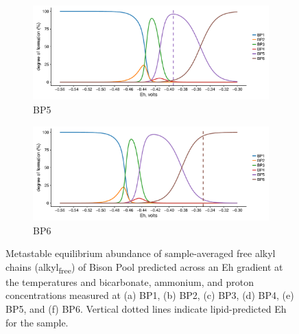 {\begin{figure}[h]
    \begin{subfigure}[b]{\linewidth}
    	\includegraphics[width=\linewidth]{"figs_ch2/Bison OF5_thermo"}
    	\caption{BP5}
        \label{fig:BP5_thermo}
    \end{subfigure}
    \begin{subfigure}[b]{\linewidth}
    	\includegraphics[width=\linewidth]{"figs_ch2/Bison OF6_thermo"}
    	\caption{BP6}
        \label{fig:BP6_thermo}
    \end{subfigure}
    
    \caption[Predicted metastable equilibrium abundance of sample-averaged free alkyl chains of Bison Pool samples]{Metastable equilibrium abundance of sample-averaged free alkyl chains (alkyl\textsubscript{free}) of Bison Pool predicted across an Eh gradient at the temperatures and bicarbonate, ammonium, and proton concentrations measured at (a) BP1, (b) BP2, (c) BP3, (d) BP4, (e) BP5, and (f) BP6. Vertical dotted lines indicate lipid-predicted Eh for the sample.}
    \label{fig:bison_thermo}
\end{figure}
\doublespace
\clearpage
}


